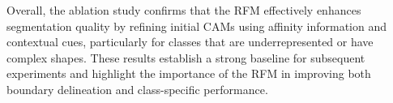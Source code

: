 Overall, the ablation study confirms that the RFM effectively enhances segmentation quality by refining initial CAMs using affinity information and contextual cues, particularly for classes that are underrepresented or have complex shapes. These results establish a strong baseline for subsequent experiments and highlight the importance of the RFM in improving both boundary delineation and class-specific performance.
